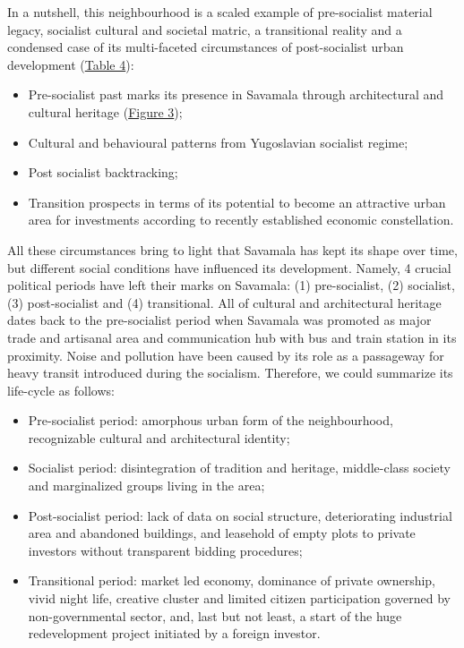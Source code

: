 \documentclass[11pt]{report}
\begin{document}
In a nutshell, this neighbourhood is a scaled example of pre-socialist material legacy, socialist cultural and societal matric, a transitional reality and a condensed case of its multi-faceted circumstances of post-socialist urban development (\href{Table 4}{Table 4}):
\begin{itemize}
\item Pre-socialist past marks its presence in Savamala through architectural and cultural heritage (\href{Figure 3}{Figure 3});
\item Cultural and behavioural patterns from Yugoslavian socialist regime;
\item Post socialist backtracking;
\item Transition prospects in terms of its potential to become an attractive urban area for investments according to recently established economic constellation.
\end{itemize}

All these circumstances bring to light that Savamala has kept its shape over time, but different social conditions have influenced its development.
Namely, 4 crucial political periods have left their marks on Savamala:
(1) pre-socialist,
(2) socialist,
(3) post-socialist
and (4) transitional. All of cultural and architectural heritage dates back to the pre-socialist period when Savamala was promoted as major trade and artisanal area and communication hub with bus and train station in its proximity. Noise and pollution have been caused by its role as a passageway for heavy transit introduced during the socialism. Therefore, we could summarize its life-cycle as follows:

\begin{itemize}
\item Pre-socialist period: amorphous urban form of the neighbourhood, recognizable cultural and architectural identity;

\item Socialist period: disintegration of tradition and heritage, middle-class society and marginalized groups living in the area;

\item Post-socialist period: lack of data on social structure, deteriorating industrial area and abandoned buildings, and leasehold of empty plots to private investors without transparent bidding procedures;

\item Transitional period: market led economy, dominance of private ownership, vivid night life, creative cluster and limited citizen participation governed by non-governmental sector, and, last but not least, a start of the huge redevelopment project initiated by a foreign  investor.
\end{itemize}
\end{document}
